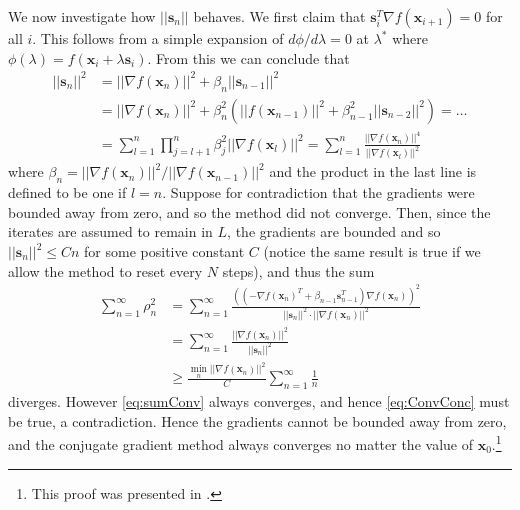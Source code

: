 \documentclass[10pt,a4paper,notitlepage]{article}
\newcommand{\abs}[1]{\lvert#1\rvert}
\newcommand{\x}{\mathbf{x}}
\newcommand{\s}{\mathbf{s}}
\begin{document}
We now investigate how $\abs{\abs{\s_{n}}}$ behaves. We first claim that $\s_{i}^{T}\nabla f(\x_{i+1})=0$ for all $i$. This follows from a simple expansion of $d\phi /d\lambda =0$ at $\lambda^{*}$ where $\phi(\lambda)=f(\x_{i}+\lambda \s_{i})$. From this we can conclude that
\begin{equation}
\begin{aligned}
\abs{\abs{\s_{n}}}^{2} &=\abs{\abs{\nabla f(\x_{n})}}^{2}+\beta_{n}\abs{\abs{\s_{n-1}}}^{2}\\
&= \abs{\abs{\nabla f(\x_{n})}}^{2}+\beta_{n}^{2}\left(\abs{\abs{f(\x_{n-1})}}^{2}+\beta_{n-1}^{2}\abs{\abs{\s_{n-2}}}^{2}\right)=\hdots\\
&=\sum_{l=1}^{n}\prod_{j=l+1}^{n}\beta_{j}^{2}\abs{\abs{\nabla f(\x_{l})}}^{2}=\sum_{l=1}^{n}\frac{\abs{\abs{\nabla f(\x_{n})}}^{4}}{\abs{\abs{\nabla f(\x_{l})}}^{2}}
\end{aligned}
\end{equation}
where $\beta_{n}=\abs{\abs{\nabla f(\x_{n})}}^{2}/\abs{\abs{\nabla f(\x_{n-1})}}^{2}$ and the product in the last line is defined to be one if $l=n$. Suppose for contradiction that the gradients were bounded away from zero, and so the method did not converge. Then, since the iterates are assumed to remain in $L$, the gradients are bounded and so $\abs{\abs{\s_{n}}}^{2}\leq Cn$ for some positive constant $C$ (notice the same result is true if we allow the method to reset every $N$ steps), and thus the sum
\begin{equation}
\begin{aligned}
\sum_{n=1}^{\infty}\rho_{n}^{2} &=\sum_{n=1}^{\infty}\frac{\left(\left(-\nabla f(\x_{n})^{T}+\beta_{n-1}\s_{n-1}^{T}\right)\nabla f(\x_{n})\right)^{2}}{\abs{\abs{\s_{n}}}^{2}\cdot \abs{\abs{\nabla f(\x_{n})}}^{2}}\\
&=\sum_{n=1}^{\infty}\frac{\abs{\abs{\nabla f(\x_{n})}}^{2}}{\abs{\abs{\s_{n}}}^{2}}\\
&\geq\frac{\min_{n}\abs{\abs{\nabla f(\x_{n})}}^{2}}{C}\sum_{n=1}^{\infty}\frac{1}{n}
\end{aligned}
\end{equation}
diverges. However \eqref{eq:sumConv} always converges, and hence \eqref{eq:ConvConc} must be true, a contradiction. Hence the gradients cannot be bounded away from zero, and the conjugate gradient method always converges no matter the value of $\x_{0}$.\footnote{This proof was presented in \cite{GlobalConvergence}.}\\
\end{document}
